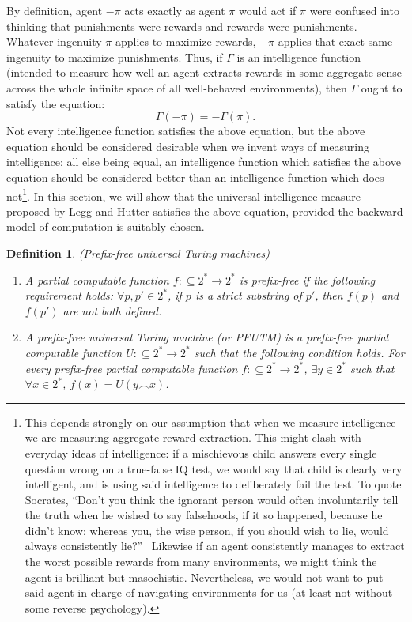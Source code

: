 \documentclass{article}
\newtheorem{definition}[theorem]{Definition}
\begin{document}
By definition, agent $-\pi$ acts exactly as agent $\pi$ would
act if $\pi$ were confused into thinking that punishments were rewards
and rewards were punishments.
Whatever ingenuity $\pi$ applies to maximize rewards,
$-\pi$ applies that exact same ingenuity to maximize punishments.
Thus, if $\Gamma$ is an intelligence function (intended to measure how
well an agent extracts rewards in some aggregate sense across the whole
infinite space of all well-behaved environments), then $\Gamma$ ought
to satisfy the equation:
\[
    \Gamma(-\pi) = -\Gamma(\pi).
\]
Not every intelligence function satisfies the above equation, but the
above equation should be considered desirable when we
invent ways of measuring intelligence: all else being equal, an
intelligence function which satisfies the above equation should be
considered better than an intelligence function which does
not\footnote{This depends strongly on our assumption that when we
measure intelligence we are measuring aggregate reward-extraction. This might clash
with everyday ideas of intelligence: if a mischievous child answers every single
question wrong on a true-false IQ test, we would say that child is clearly very
intelligent, and is using said intelligence to deliberately fail the test.
To quote Socrates, ``Don't you think the ignorant person would often involuntarily
tell the truth when he wished to say falsehoods, if it so happened, because he
didn't know; whereas you, the wise person, if you should wish to lie,
would always consistently lie?''\ \cite{lesserhippias}
Likewise if an agent consistently manages to extract the worst possible rewards
from many environments, we might think the agent is brilliant but
masochistic.
Nevertheless, we would not want to put said agent
in charge of navigating environments for us (at least not without some
reverse psychology).}.
In this section, we will show that the universal intelligence measure
proposed by Legg and Hutter satisfies the above equation, provided the
backward model of computation is suitably chosen.

\begin{definition}
    (Prefix-free universal Turing machines)
    \begin{enumerate}
        \item A partial computable function $f:\subseteq 2^*\to 2^*$
        is \emph{prefix-free} if the following requirement holds:
        $\forall p,p'\in 2^*$, if $p$ is a strict substring of $p'$,
        then $f(p)$ and $f(p')$ are not both defined.
        \item A \emph{prefix-free universal Turing machine}
        (or \emph{PFUTM}) is a prefix-free
        partial computable function $U:\subseteq 2^*\to 2^*$
        such that the following condition holds.
        For every prefix-free partial computable function
        $f:\subseteq 2^*\to 2^*$, $\exists y\in 2^*$ such that
        $\forall x\in 2^*$, $f(x)=U(y\frown x)$.
    \end{enumerate}
\end{definition}
\end{document}
